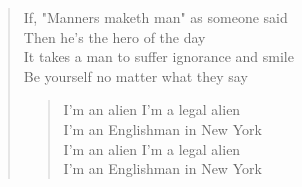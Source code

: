\documentclass[9pt,a4paper,oneside, onecolumn]{article}
\begin{document}
\begin{verse}
If, "Manners maketh man" as someone said\\
Then he's the hero of the day\\
It takes a man to suffer ignorance and smile\\
Be yourself no matter what they say\\

\begin{verse}
I'm an alien I'm a legal alien\\
I'm an Englishman in New York\\
I'm an alien I'm a legal alien\\
I'm an Englishman in New York\\
\end{verse}
\end{verse}
\end{document}
